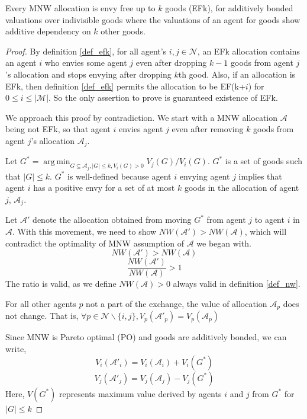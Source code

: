 \begin{theorem}
Every MNW allocation is envy free up to $k$ goods (EFk), for additively bonded valuations over indivisible goods where the valuations of an agent for goods show additive dependency on $k$ other goods.
\end{theorem}

\begin{proof}
By definition \ref{def_efk}, for all agent's $i, j \in \mathcal{N}$, an EFk allocation contains an agent $i$ who envies some agent $j$ even after dropping $k-1$ goods from agent $j$'s allocation and stops envying after dropping $k$th good. Also, if an allocation is EFk, then definition \ref{def_efk} permits the allocation to be EF(k+$i$) for $0 \leq i \leq |\mathcal{M}|$. So the only assertion to prove is guaranteed existence of EFk.

We approach this proof by contradiction. We start with a MNW allocation $\mathcal{A}$ being not EFk, so that agent $i$ envies agent $j$ even after removing $k$ goods from agent $j$'s allocation $\mathcal{A}_j$.

Let $G^* = \operatorname{arg\,min}_{G \subseteq \mathcal{A}_j, |G| \leq k, V_i(G)>0} V_j(G)/V_i(G)$. $G^*$ is a set of goods such that $|G| \leq k$. $G^*$ is well-defined because agent $i$ envying agent $j$ implies that agent $i$ has a positive envy for a set of at most $k$ goods in the allocation of agent $j$, $\mathcal{A}_j$. 

Let $\mathcal{A}'$ denote the allocation obtained from moving $G^*$ from agent $j$ to agent $i$ in $\mathcal{A}$. With this movement, we need to show $NW(\mathcal{A}') > NW(\mathcal{A})$, which will contradict the optimality of MNW assumption of $\mathcal{A}$ we began with.
$$
    NW(\mathcal{A}') > NW(\mathcal{A})
$$
$$
    \frac{NW(\mathcal{A}')}{NW(\mathcal{A})} > 1
$$
The ratio is valid, as we define $NW(\mathcal{A}) > 0$ always valid in definition \ref{def_nw}.

For all other agents $p$ not a part of the exchange, the value of allocation $\mathcal{A}_p$ does not change. That is, $\forall p \in \mathcal{N}\backslash\{i,j\}, V_p(\mathcal{A}'_p) = V_p(\mathcal{A}_p)$

Since MNW is Pareto optimal (PO) and goods are additively bonded, we can write,
$$
    V_i(\mathcal{A}'_i) = V_i(\mathcal{A}_i) + V_i(G^*)
$$
$$
    V_j(\mathcal{A}'_j) = V_j(\mathcal{A}_j) - V_j(G^*)
$$
Here, $V(G^*)$ represents maximum value derived by agents $i$ and $j$ from $G^*$ for $|G| \leq k$


\end{proof}
